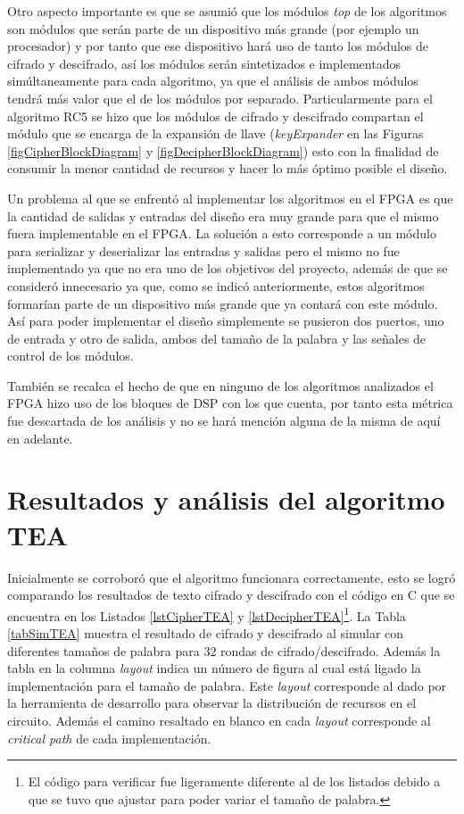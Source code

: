 Otro aspecto importante es que se asumió que los módulos \textit{top} de los algoritmos son módulos que serán parte de un dispositivo más grande (por ejemplo un procesador) y por tanto que ese dispositivo hará uso de tanto los módulos de cifrado y descifrado, así los módulos serán sintetizados e implementados simúltaneamente para cada algoritmo, ya que el análisis de ambos módulos tendrá más valor que el de los módulos por separado. Particularmente para el algoritmo RC5 se hizo que los módulos de cifrado y descifrado compartan el módulo que se encarga de la expansión de llave (\textit{keyExpander} en las Figuras \ref{figCipherBlockDiagram} y \ref{figDecipherBlockDiagram}) esto con la finalidad de consumir la menor cantidad de recursos y hacer lo más óptimo posible el diseño.


Un problema al que se enfrentó al implementar los algoritmos en el FPGA es que la cantidad de salidas y entradas del diseño era muy grande para que el mismo fuera implementable en el FPGA. La solución a esto corresponde a un módulo para serializar y deserializar las entradas y salidas pero el mismo no fue implementado ya que no era uno de los objetivos del proyecto, además de que se consideró innecesario ya que, como se indicó anteriormente, estos algoritmos formarían parte de un dispositivo más grande que ya contará con este módulo. Así para poder implementar el diseño simplemente se pusieron dos puertos, uno de entrada y otro de salida, ambos del tamaño de la palabra y las señales de control de los módulos.

También se recalca el hecho de que en ninguno de los algoritmos analizados el FPGA hizo uso de los bloques de DSP con los que cuenta, por tanto esta métrica fue descartada de los análisis y no se hará mención alguna de la misma de aquí en adelante.

\section{Resultados y análisis del algoritmo TEA} \label{resultadosAnalisisTEA}
Inicialmente se corroboró que el algoritmo funcionara correctamente, esto se logró comparando los resultados de texto cifrado y descifrado con el código en C que se encuentra en los Listados \ref{lstCipherTEA} y \ref{lstDecipherTEA}\footnote{El código para verificar fue ligeramente diferente al de los listados debido a que se tuvo que ajustar para poder variar el tamaño de palabra.}. La Tabla \ref{tabSimTEA} muestra el resultado de cifrado y descifrado al simular con diferentes tamaños de palabra para 32 rondas de cifrado/descifrado. Además la tabla en la columna \textit{layout} indica un número de figura al cual está ligado la implementación para el tamaño de palabra. Este \textit{layout} corresponde al dado por la herramienta de desarrollo para observar la distribución de recursos en el circuito. Además el camino resaltado en blanco en cada \textit{layout} corresponde al \textit{critical path} de cada implementación.

